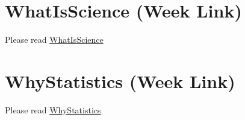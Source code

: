 \documentclass[
  letterpaper,
  DIV=11,
  numbers=noendperiod]{scrreprt}
\begin{document}

\chapter{WhatIsScience (Week Link)}\label{whatisscience-week-link}

Please read \href{../textbook/01-WhatIsScience.qmd}{WhatIsScience}

\chapter{WhyStatistics (Week Link)}\label{whystatistics-week-link}

Please read \href{../textbook/01-WhyStatistics.qmd}{WhyStatistics}
\end{document}
